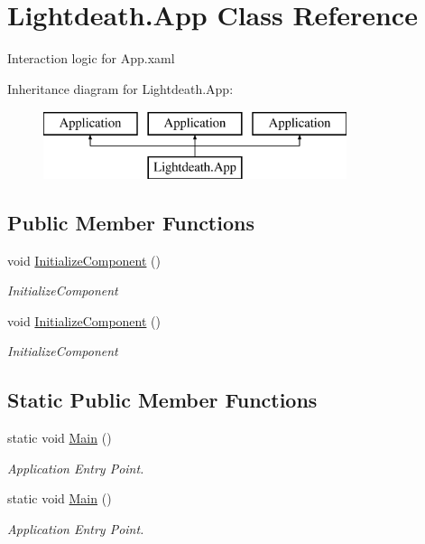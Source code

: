 \hypertarget{class_lightdeath_1_1_app}{}\section{Lightdeath.\+App Class Reference}
\label{class_lightdeath_1_1_app}


Interaction logic for App.\+xaml  


Inheritance diagram for Lightdeath.\+App\+:\begin{figure}[H]
\begin{center}
\leavevmode
\includegraphics[height=2.000000cm]{class_lightdeath_1_1_app}
\end{center}
\end{figure}
\subsection*{Public Member Functions}
\begin{DoxyCompactItemize}
\item 
void \hyperlink{class_lightdeath_1_1_app_a7bd1852993058f1a829307ce757eed11}{Initialize\+Component} ()
\begin{DoxyCompactList}\small\item\em Initialize\+Component \end{DoxyCompactList}\item 
void \hyperlink{class_lightdeath_1_1_app_a7bd1852993058f1a829307ce757eed11}{Initialize\+Component} ()
\begin{DoxyCompactList}\small\item\em Initialize\+Component \end{DoxyCompactList}\end{DoxyCompactItemize}
\subsection*{Static Public Member Functions}
\begin{DoxyCompactItemize}
\item 
static void \hyperlink{class_lightdeath_1_1_app_a6526b52830e1c93ae27540772cb8411f}{Main} ()
\begin{DoxyCompactList}\small\item\em Application Entry Point. \end{DoxyCompactList}\item 
static void \hyperlink{class_lightdeath_1_1_app_a6526b52830e1c93ae27540772cb8411f}{Main} ()
\begin{DoxyCompactList}\small\item\em Application Entry Point. \end{DoxyCompactList}\end{DoxyCompactItemize}


